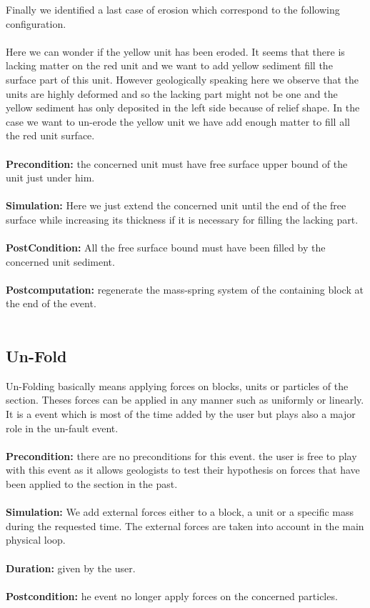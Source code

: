 \documentclass[12pt, a4paper]{memoir} %
\begin{document}
Finally we identified a last case of erosion which correspond to the following configuration.\\\\
Here we can wonder if the yellow unit has been eroded.  It seems that there is lacking matter on the red unit and we want to add yellow sediment fill the surface part of this unit. However geologically speaking here we observe that the units are highly deformed and so the lacking part might not be one and the yellow sediment has only deposited in the left side because of relief shape. In the case we want to un-erode  the yellow unit we have add enough matter to fill all the red unit surface.\\\\
\textbf{Precondition:} the concerned unit must have free surface upper bound of the unit just under him.\\\\
\textbf{Simulation:} Here we just extend the concerned unit until the end of the free surface while increasing its thickness if it is necessary for filling the lacking part.\\\\
\textbf{PostCondition:} All the free surface bound must have been filled by the concerned unit sediment.\\\\
\textbf{Postcomputation:} regenerate the mass-spring system of the containing block at the end of the event.\\\\
\subsection{Un-Fold}

Un-Folding basically means applying forces on blocks, units or particles of the section. Theses forces can be applied in any manner such as uniformly or linearly. It is a event which is most of the time added by the user but plays also a major role in the un-fault event.\\\\
\textbf{Precondition:} there are no preconditions for this event. the user is free to play with this event as it allows geologists to test their hypothesis on forces that have been applied to the section in the past.\\\\
\textbf{Simulation:} We add external forces either to a block, a unit or a specific mass during the requested time. The external forces are taken into account in the main physical loop.\\\\
\textbf{Duration:} given by the user.\\\\
\textbf{Postcondition:} he event no longer apply forces on the concerned particles.\\\\
\end{document}
